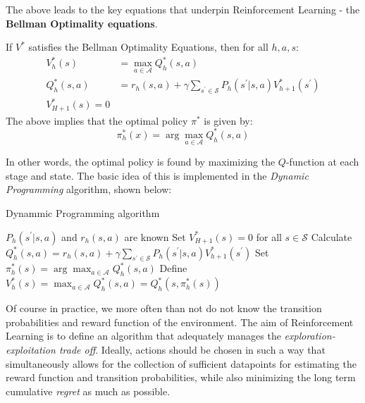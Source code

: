 \documentclass{mldsmsc}
\begin{document}
The above leads to the key equations that underpin Reinforcement Learning - the \textbf{Bellman Optimality equations}.

\begin{proposition}\label{prop:bellman-optimality}
    If $V^*$ satisfies the Bellman Optimality Equations, then for all $h, a, s$:
    \begin{align*}
        V_h^*(s) &= \max_{a \in \mathcal{A}}Q_{h}^*(s,a)\\
        Q_h^*(s,a) &= r_h(s,a) + \gamma \sum_{s^\prime \in \mathcal{S}} P_h (s^\prime | s, a)V_{h+1}^*(s^\prime)\\
        V_{H+1}^*(s) = 0
    \end{align*}
    The above implies that the optimal policy $\pi^*$ is given by:
    \[
    \pi_h^*(x) = \arg\max_{a \in \mathcal{A}} Q_h^*(s,a)
    \]
\end{proposition}

In other words, the optimal policy is found by maximizing the $Q$-function at each stage and
state. The basic idea of this is implemented in the \emph{Dynamic Programming} algorithm, shown below:

\begin{algorithm}
    \caption{Dynammic Programming algorithm}\label{alg:dynammic-programming}
    \begin{algorithmic}[1]
        \Require $P_h(s^\prime|s,a)$ and $r_h(s,a)$ are known
        \State Set $V_{H+1}^*(s) = 0$ for all $s \in \mathcal{S}$
            \State Calculate $Q_h^*(s,a) = r_h(s,a) + \gamma \sum_{s^\prime \in \mathcal{S}}P_h(s^\prime |s,a) V_{h+1}^*(s^\prime)$
            \State Set $\pi_h^*(s) = \arg\max_{a \in \mathcal{A}} Q_h^*(s,a)$
            \State Define $V_h^*(s) = \max_{a \in \mathcal{A}}Q_h^*(s,a) = Q_h^*(s, \pi_h^*(s))$
        \EndFor
    \end{algorithmic}
\end{algorithm}

Of course in practice, we more often than not do not know the transition probabilities and
reward function of the environment.
The aim of Reinforcement Learning
is to define an algorithm that adequately manages the \emph{exploration-exploitation trade off}.
Ideally, actions should be chosen in such a way that simultaneously allows for the collection of sufficient
datapoints for estimating the reward function and transition probabilities, while also minimizing
the long term cumulative \emph{regret} as much as possible.
\end{document}
